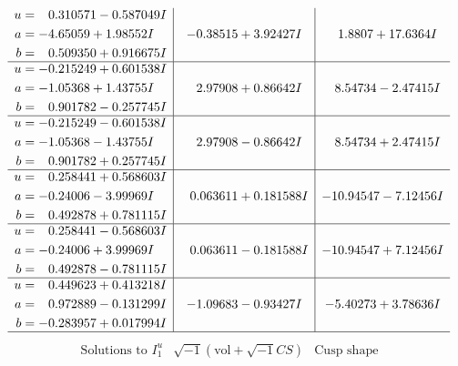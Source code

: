 \documentclass[1p]{elsarticle_modified}
\theoremstyle{definition}
\newcommand{\I}{\sqrt{-1}}
\begin{document}
$$\begin{array}{c|c|c}
\begin{aligned}
u &= \phantom{-}0.310571 - 0.587049 I \\
a &= -4.65059 + 1.98552 I \\
b &= \phantom{-}0.509350 + 0.916675 I\end{aligned}
 & -0.38515 + 3.92427 I & \phantom{-}1.8807 + 17.6364 I \\ \hline\begin{aligned}
u &= -0.215249 + 0.601538 I \\
a &= -1.05368 + 1.43755 I \\
b &= \phantom{-}0.901782 - 0.257745 I\end{aligned}
 & \phantom{-}2.97908 + 0.86642 I & \phantom{-}8.54734 - 2.47415 I \\ \hline\begin{aligned}
u &= -0.215249 - 0.601538 I \\
a &= -1.05368 - 1.43755 I \\
b &= \phantom{-}0.901782 + 0.257745 I\end{aligned}
 & \phantom{-}2.97908 - 0.86642 I & \phantom{-}8.54734 + 2.47415 I \\ \hline\begin{aligned}
u &= \phantom{-}0.258441 + 0.568603 I \\
a &= -0.24006 - 3.99969 I \\
b &= \phantom{-}0.492878 + 0.781115 I\end{aligned}
 & \phantom{-}0.063611 + 0.181588 I & -10.94547 - 7.12456 I \\ \hline\begin{aligned}
u &= \phantom{-}0.258441 - 0.568603 I \\
a &= -0.24006 + 3.99969 I \\
b &= \phantom{-}0.492878 - 0.781115 I\end{aligned}
 & \phantom{-}0.063611 - 0.181588 I & -10.94547 + 7.12456 I \\ \hline\begin{aligned}
u &= \phantom{-}0.449623 + 0.413218 I \\
a &= \phantom{-}0.972889 - 0.131299 I \\
b &= -0.283957 + 0.017994 I\end{aligned}
 & -1.09683 - 0.93427 I & -5.40273 + 3.78636 I\\
 \hline 
 \end{array}$$\newpage$$\begin{array}{c|c|c}  
\text{Solutions to }I^u_{1}& \I (\text{vol} + \sqrt{-1}CS) & \text{Cusp shape}\\

\end{array}$$
\end{document}
